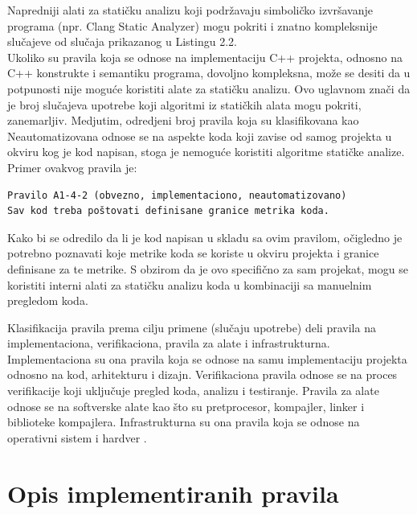 \documentclass[12pt,oneside]{memoir}
\begin{document}
  Napredniji alati za statičku analizu koji podržavaju simboličko izvršavanje programa (npr. Clang Static Analyzer) mogu pokriti i znatno kompleksnije 
  slučajeve od slučaja prikazanog u Listingu 2.2.
  \\
  \indent 
  Ukoliko su pravila koja se odnose na implementaciju C++ projekta, odnosno na C++ konstrukte i semantiku programa, dovoljno kompleksna, može se desiti da u potpunosti nije moguće koristiti alate za statičku analizu. Ovo uglavnom znači da je broj slučajeva upotrebe koji algoritmi iz statičkih alata mogu pokriti, zanemarljiv. Medjutim, odredjeni broj pravila koja su klasifikovana kao Neautomatizovana odnose se na aspekte koda koji zavise od samog projekta
  u okviru kog je kod napisan, stoga je nemoguće koristiti algoritme statičke analize.
  Primer ovakvog pravila je:
  \begin{verbatim}
Pravilo A1-4-2 (obvezno, implementaciono, neautomatizovano)
Sav kod treba poštovati definisane granice metrika koda.
\end{verbatim}


  Kako bi se odredilo da li je kod napisan u skladu sa ovim pravilom, očigledno je potrebno poznavati koje metrike koda se koriste u okviru projekta i
  granice definisane za te metrike. S obzirom da je ovo specifično za sam projekat, mogu se koristiti interni alati za statičku analizu koda u kombinaciji
  sa manuelnim pregledom koda. 

Klasifikacija pravila prema cilju primene (slučaju upotrebe) deli pravila na implementaciona, verifikaciona, pravila za alate i infrastrukturna.
Implementaciona su ona pravila koja se odnose na samu implementaciju projekta odnosno na kod, arhitekturu i dizajn.
Verifikaciona pravila odnose se na proces verifikacije koji uključuje pregled koda, analizu i testiranje.
Pravila za alate odnose se na softverske alate kao što su pretprocesor, kompajler, linker i biblioteke kompajlera.
Infrastrukturna su ona pravila koja se odnose na operativni sistem i hardver \cite{AutosarGuidelines}.


\section{Opis implementiranih pravila}
\end{document}
